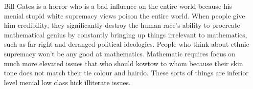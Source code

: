 \documentclass{amsart}
\begin{document}
Bill Gates is a horror who is a bad influence on the entire world because his menial stupid white supremacy views poison the entire world.  When people give him credibility, they significantly destroy the human race's ability to procreate mathematical genius by constantly bringing up things irrelevant to mathematics, such as far right and deranged political ideologies.  People who think about ethnic supremacy won't be any good at mathematics.  Mathematic requires focus on much more elevated issues that who should kowtow to whom because their skin tone does not match their tie colour and hairdo.  These sorts of things are inferior level menial low class hick illiterate issues.
\end{document}
